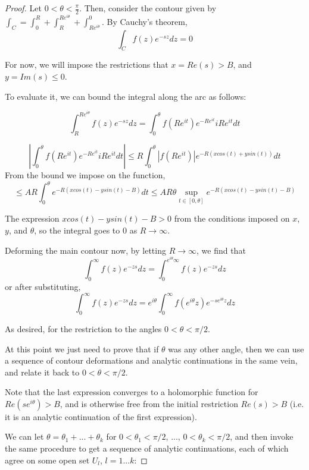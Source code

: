 \documentclass{article}
\begin{document}
	\begin{proof}
		Let $ 0 < \theta < \frac{\pi}{2}$. Then, consider the contour given by $\int_{C} = \int_{0}^{R} + \int_{R}^{R e^{i \theta}} + \int_{R e^{i \theta}}^{0}$.
		By Cauchy's theorem,
		$$ \int_{C} f(z) e^{-sz} dz = 0 $$
		
		For now, we will impose the restrictions that $x = Re(s) > B$, and $y = Im(s) \leq 0$. 
		
		To evaluate it, we can bound the integral along the arc as follows:
		
		$$ \int_{R}^{R e^{i \theta}} f(z) e^{-sz} dz = \int_{0}^{\theta} f(R e^{i t}) e^{-R e^{i t} } i R e^{i t} dt $$
		
		$$ \left| \int_{0}^{\theta} f(R e^{i t}) e^{-R e^{i t} } i R e^{i t} dt \right| \leq R \int_{0}^{\theta} \left| f(R e^{i t}) \right| e^{-R \left( x cos(t) + y sin(t) \right)} dt $$
		From the bound we impose on the function,
		$$ \leq A R \int_{0}^{\theta} e^{-R \left( x cos(t) - y sin(t) - B \right)} dt \leq A R \theta \sup_{t \in \left[ 0, \theta \right]}  e^{-R \left( x cos(t) - y sin(t) - B \right)} $$
		
		The expression $x cos(t) - y sin(t) - B > 0$ from the conditions imposed on $x$, $y$, and $\theta$, so the integral goes to $0$ as $R \rightarrow \infty$.
		
		Deforming the main contour now, by letting $R \rightarrow \infty$, we find that
		$$ \int_{0}^{\infty} f(z) e^{-zs} dz = \int_{0}^{ e^{i \theta} \infty} f(z) e^{-zs} dz $$
		or after substituting, 
		$$ \int_{0}^{\infty} f(z) e^{-zs} dz = e^{i \theta} \int_{0}^{\infty} f(e^{i \theta} z) e^{-s e^{i \theta} z} dz $$
		
		As desired, for the restriction to the angles $0 < \theta < \pi/2$. 
		
		At this point we just need to prove that if $\theta$ was any other angle, then we can use a sequence of contour deformations and analytic continuations in the same vein, and relate it back to $0 < \theta < \pi/2$. 
		
		Note that the last expression converges to a holomorphic function for $Re(s e^{i \theta}) > B$, and is otherwise free from the initial restriction $ Re(s) > B $ (i.e. it is an analytic continuation of the first expression). 
		
		We can let $\theta = \theta_1 + ... + \theta_k$ for $ 0 < \theta_1 < \pi/2 $, ..., $ 0 < \theta_k < \pi/2 $, and then invoke the same procedure to get a sequence of analytic continuations, each of which agree on some open set $U_l$, $l = 1 ... k$:
		

\end{proof}
\end{document}
